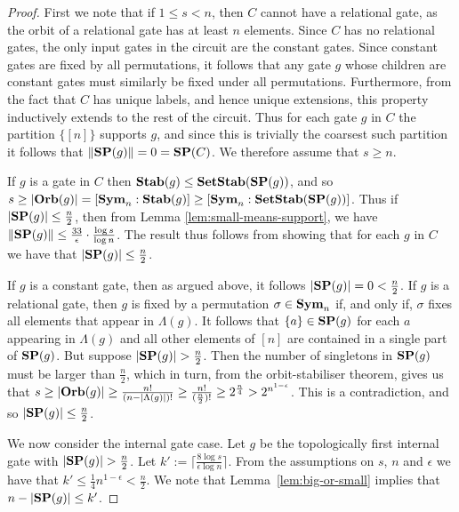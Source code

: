 \documentclass[../main/thesis.tex]{subfiles}
\begin{document}
\begin{proof}
  First we note that if $1 \leq s < n$, then $C$ cannot have a relational gate,
  as the orbit of a relational gate has at least $n$ elements. Since $C$ has no
  relational gates, the only input gates in the circuit are the constant gates.
  Since constant gates are fixed by all permutations, it follows that any gate
  $g$ whose children are constant gates must similarly be fixed under all
  permutations. Furthermore, from the fact that $C$ has unique labels, and hence
  unique extensions, this property inductively extends to the rest of the
  circuit. Thus for each gate $g$ in $C$ the partition $\{[n]\}$ supports $g$,
  and since this is trivially the coarsest such partition it follows that $\|
  \text{\textbf{SP}}(g) \| = 0 = \text{\textbf{SP}}(C)$. We therefore assume that $s \geq n$.

  If $g$ is a gate in $C$ then $\text{\textbf{Stab}} (g) \leq \text{\textbf{SetStab}}(\text{\textbf{SP}}(g))$, and so $s \geq
  \vert \text{\textbf{Orb}}(g) \vert = [\text{\textbf{Sym}}_n : \text{\textbf{Stab}}(g)] \geq [\text{\textbf{Sym}}_n : \text{\textbf{SetStab}}(\text{\textbf{SP}}(g))]$.
  Thus if $\vert \text{\textbf{SP}}(g) \vert \leq \frac{n}{2}$, then from Lemma
  \ref{lem:small-means-support}, we have $\| \text{\textbf{SP}} (g) \| \leq \frac{33}{\epsilon}
  \cdot \frac{\log s} {\log n}$. The result thus follows from showing that for
  each $g$ in $C$ we have that $\vert \text{\textbf{SP}} (g) \vert \leq \frac{n}{2}$.
  
  If $g$ is a constant gate, then as argued above, it follows $\vert \text{\textbf{SP}}(g)
  \vert = 0 < \frac{n}{2}$. If $g$ is a relational gate, then $g$ is fixed by a
  permutation $\sigma \in \text{\textbf{Sym}}_n$ if, and only if, $\sigma$ fixes all elements
  that appear in $\Lambda(g)$. It follows that $\{a\} \in \text{\textbf{SP}}(g)$ for each $a$
  appearing in $\Lambda(g)$ and all other elements of $[n]$ are contained in a
  single part of $\text{\textbf{SP}}(g)$. But suppose $\vert \text{\textbf{SP}}(g) \vert > \frac{n}{2}$. Then
  the number of singletons in $\text{\textbf{SP}}(g)$ must be larger than $\frac{n}{2}$, which
  in turn, from the orbit-stabiliser theorem, gives us that $ s \geq \vert \text{\textbf{Orb}}
  (g) \vert \geq \frac{n!}{(n-\vert \Lambda (g) \vert)!} \geq
  \frac{n!}{{(\frac{n}{2}})!} \geq 2^{\frac{n}{4}} > 2^{n^{1- \epsilon}} $. This
  is a contradiction, and so $\vert \text{\textbf{SP}}(g) \vert \leq \frac{n}{2}$.

  We now consider the internal gate case. Let $g$ be the topologically first
  internal gate with $\vert \text{\textbf{SP}}(g) \vert > \frac{n}{2}$. Let $k' := \lceil
  \frac{8 \log s}{\epsilon \log n} \rceil$. From the assumptions on $s$, $ n$
  and $\epsilon$ we have that $k' \leq \frac{1}{4}n^{1-\epsilon} < \frac{n}{2}$.
  We note that Lemma~\ref{lem:big-or-small} implies that $n - \vert \text{\textbf{SP}}(g) \vert
  \leq k'$.
  

\end{proof}
\end{document}
